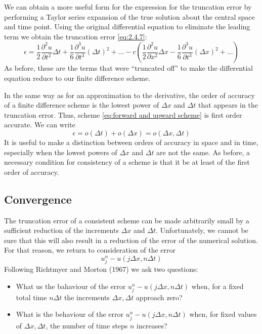 We can obtain a more useful form for the expression for the truncation error by performing a Taylor series expansion of the true solution about the central space and time point. Using the original differential equation to eliminate the leading term we obtain the truncation error \ref{eq:2.4.7}:
\begin{equation}\label{eq: 2.4.8}
    \epsilon=\frac{1}{2}\frac{\partial^2u}{\partial t^2}\Delta t+\frac{1}{6}\frac{\partial^3u}{\partial t^3}(\Delta t)^2+\dots-c\left(\frac{1}{2}\frac{\partial^2u}{\partial x^2}\Delta x-\frac{1}{6}\frac{\partial^3u}{\partial t^3}(\Delta x)^2+\dots\right)
\end{equation}
As before, these are the terms that were “truncated off” to make the differential equation reduce to our finite difference scheme.

In the same way as for an approximation to the derivative, the order of accuracy of a finite difference scheme is the lowest power of $\Delta x$ and $\Delta t$ that appears in the truncation error. Thus, scheme \ref{eq:forward and upward scheme} is first order accurate. We can write
$$\epsilon=o(\Delta t)+o(\Delta x)=o(\Delta x,\Delta t)$$
It is useful to make a distinction between orders of accuracy in space and in time, especially when the lowest powers of $\Delta x$ and $\Delta t$ are not the same. As before, a necessary condition for consistency of a scheme is that it be at least of the first order of accuracy. 
\subsection{Convergence}
The truncation error of a consistent scheme can be made arbitrarily small by a sufficient reduction of the increments $\Delta x$ and $\Delta t$. Unfortunately, we cannot be sure that this will also result in a reduction of the error of the numerical solution. For that reason, we return to consideration of the error 
$$u_j^n-u(j\Delta x,n\Delta t)$$
Following Richtmyer and Morton (1967) we ask two questions:
\begin{itemize}
    \item What us the bahaviour of the error $u_j^n-u(j\Delta x, n\Delta t)$ when, for a fixed total time $n\Delta t$ the increments $\Delta x, \Delta t$ approach zero?
    \item What is the behaviour of the error $u_j^n-u(j\Delta x, n\Delta t)$ when, for fixed values of $\Delta x, \Delta t$, the number of time steps $n$ increases?
\end{itemize}
 
